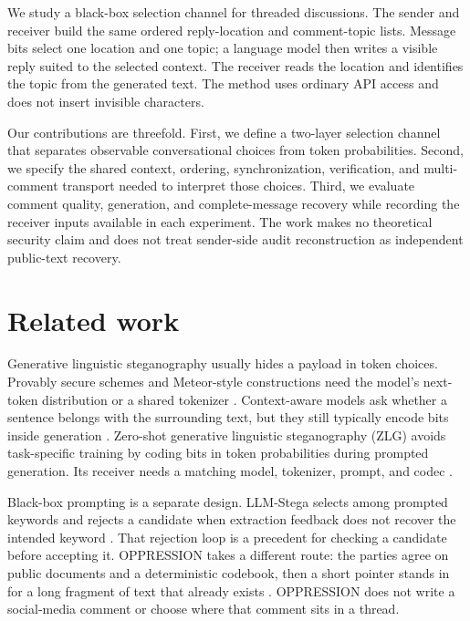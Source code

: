\documentclass[3p,times,procedia]{elsarticle}
\begin{document}
We study a black-box selection channel for threaded discussions. The sender and receiver build the same ordered reply-location and comment-topic lists. Message bits select one location and one topic; a language model then writes a visible reply suited to the selected context. The receiver reads the location and identifies the topic from the generated text. The method uses ordinary API access and does not insert invisible characters.

Our contributions are threefold. First, we define a two-layer selection channel that separates observable conversational choices from token probabilities. Second, we specify the shared context, ordering, synchronization, verification, and multi-comment transport needed to interpret those choices. Third, we evaluate comment quality, generation, and complete-message recovery while recording the receiver inputs available in each experiment. The work makes no theoretical security claim and does not treat sender-side audit reconstruction as independent public-text recovery.

\section{Related work}

Generative linguistic steganography usually hides a payload in token choices. Provably secure schemes and Meteor-style constructions need the model's next-token distribution or a shared tokenizer \citep{zhang2021provably,kaptchuk2021meteor}. Context-aware models ask whether a sentence belongs with the surrounding text, but they still typically encode bits inside generation \citep{ding2023context,liao2024co,wang2023hi}. Zero-shot generative linguistic steganography (ZLG) avoids task-specific training by coding bits in token probabilities during prompted generation. Its receiver needs a matching model, tokenizer, prompt, and codec \citep{lin2024zero}.

Black-box prompting is a separate design. LLM-Stega selects among prompted keywords and rejects a candidate when extraction feedback does not recover the intended keyword \citep{wu2024generative}. That rejection loop is a precedent for checking a candidate before accepting it. OPPRESSION takes a different route: the parties agree on public documents and a deterministic codebook, then a short pointer stands in for a long fragment of text that already exists \citep{zillien2024oppression}. OPPRESSION does not write a social-media comment or choose where that comment sits in a thread.
\end{document}
